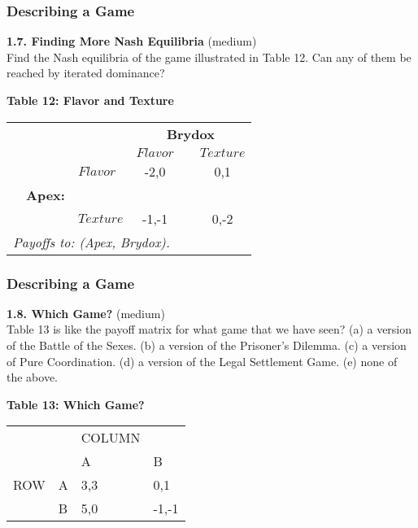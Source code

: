  \begin{frame}[fragile]\frametitle{Describing a Game}
 
 
{\bf 1.7.  Finding More  Nash Equilibria} (medium)\\
 Find the Nash equilibria of the   game illustrated in Table   12. Can any of
them be reached by   iterated dominance?

\begin{center}
 {\bf Table  12: Flavor and Texture   }

 \begin{tabular}{lllccc} &    &     &\multicolumn{3}{c}{\bf Brydox}\\
 &   &     &    $Flavor$   &   &  $Texture$   \\ &   &   $Flavor$     &     -2,0
&   & 0,1 \\ & {\bf Apex:} &  &   & &  \\ &  &  $Texture$  &   -1,-1  &    &
0,-2 \\ \multicolumn{6}{l}{\it Payoffs to: (Apex, Brydox).} \end{tabular}
\end{center}

\end{frame}
 \begin{frame}[fragile]\frametitle{Describing a Game}
 
 
 {\bf 1.8.   Which Game?} (medium)\\
Table 13 is like the payoff matrix for what game that we have seen?  (a) a
version of the Battle of the Sexes.  (b) a version of the Prisoner's Dilemma.
(c) a version of Pure Coordination.  (d)  a version of the Legal Settlement
Game.  (e) none of the above.

\begin{center} {\bf Table 13: Which Game?   }

\begin{tabular}{llll}
 &    &        COLUMN& \\ &         &     A &       B\\
 ROW   &   A  &  3,3    &  0,1\\ &  B   & 5,0    &  -1,-1\\ \end{tabular}
\end{center}

\end{frame}

